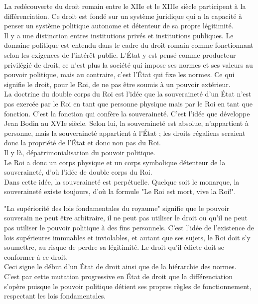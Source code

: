 \documentclass[10pt, a4paper, openany]{book}
\begin{document}
La redécouverte du droit romain entre le XIIe et le XIIIe siècle participent à la différenciation. Ce droit est fondé sur un système juridique qui a la capacité à penser un système politique autonome et détenteur de sa propre légitimité. \\
Il y a une distinction entres institutions privés et institutions publiques. Le domaine politique est entendu dans le cadre du droit romain comme fonctionnant selon les exigences de l'intérêt public. L'État y est pensé comme producteur privilégié de droit, ce n'est plus la société qui impose ses normes et ses valeurs au pouvoir politique, mais au contraire, c'est l'État qui fixe les normes. Ce qui signifie le droit, pour le Roi, de ne pas être soumis à un pouvoir extérieur. \\


La doctrine du double corps du Roi est l'idée que la souveraineté d'un État n'est pas exercée par le Roi en tant que personne physique mais par le Roi en tant que fonction. C'est la fonction qui confère la souveraineté. C'est l'idée que développe Jean Bodin au XVIe siècle. Selon lui, la souveraineté est absolue, n'appartient à personne, mais la souveraineté appartient à l'État ; les droits régaliens seraient donc la propriété de l'État et donc non pas du Roi. \\
Il y là, dépatrimonialisation du pouvoir politique. \\
Le Roi a donc un corps physique et un corps symbolique détenteur de la souveraineté, d'où l'idée de double corps du Roi. \\
Dans cette idée, la souveraineté est perpétuelle. Quelque soit le monarque, la souveraineté existe toujours, d'où la formule "Le Roi est mort, vive la Roi!". 


"La supériorité des lois fondamentales du royaume" signifie que le pouvoir souverain ne peut être arbitraire, il ne peut pas utiliser le droit ou qu'il ne peut pas utiliser le pouvoir politique à des fins personnels. C'est l'idée de l'existence de lois supérieures immuables et inviolables, et autant que ses sujets, le Roi doit s'y soumettre, au risque de perdre sa légitimité. Le droit qu'il édicte doit se conformer à ce droit. \\
Ceci signe le début d'un État de droit ainsi que de la hiérarchie des normes. \\
C'est par cette mutation progressive en État de droit que la différenciation s'opère puisque le pouvoir politique détient ses propres règles de fonctionnement, respectant les lois fondamentales. 
\end{document}

